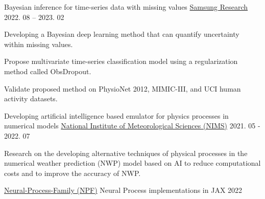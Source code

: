 \documentclass[11pt, a4paper]{cv}
\begin{document}
\begin{cventries}

  \cvproject
    {Bayesian inference for time-series data with missing values} %
    {\href{https://research.samsung.com}{Samsung Research}} %
    {2022. 08 -- 2023. 02} %
    {
      \begin{cvitems} %
        \item {Developing a Bayesian deep learning method that can quantify uncertainty within missing values.}
        \item {Propose multivariate time-series classification model using a regularization method called ObsDropout.}
        \item {Validate proposed method on PhysioNet 2012, MIMIC-III, and UCI human activity datasets.}
      \end{cvitems}
    }

  \cvproject
    {Developing artificial intelligence based emulator for physics processes in numerical models} %
    {\href{http://www.nims.go.kr/AE/MA/main.jsp}{National Institute of Meteorological Sciences (NIMS)}} %
    {2021. 05 - 2022. 07} %
    {
      \begin{cvitems} %
        \item {Research on the developing alternative techniques of physical processes in the numerical weather prediction (NWP) model based on AI to reduce computational costs and to improve the accuracy of NWP.}
      \end{cvitems}
    }

\end{cventries}


\begin{cventries}

  \cvsoftware
    {\href{https://github.com/yuneg11/Neural-Process-Family}{Neural-Process-Family (NPF)}} %
    {Neural Process implementations in JAX} %
    {2022} %
    {} %

\end{cventries}
\end{document}
